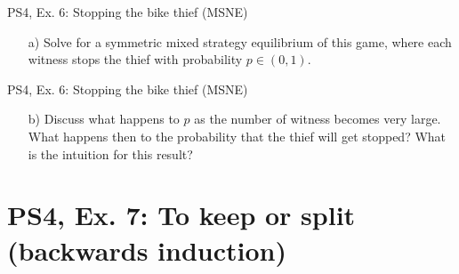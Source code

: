\begin{frame}{PS4, Ex. 6: Stopping the bike thief (MSNE)}
    \begin{itemize}
      \item[a)] Solve for a symmetric mixed strategy equilibrium of this game, where each witness stops the thief with probability $p\in(0,1)$.
    \end{itemize}
\end{frame}
\begin{frame}{PS4, Ex. 6: Stopping the bike thief (MSNE)}
    \begin{itemize}
      \item[b)] Discuss what happens to $p$ as the number of witness becomes very large. What happens then to the probability that the thief will get stopped? What is the intuition for this result?
    \end{itemize}
\end{frame}


\section{PS4, Ex. 7: To keep or split (backwards induction)}

